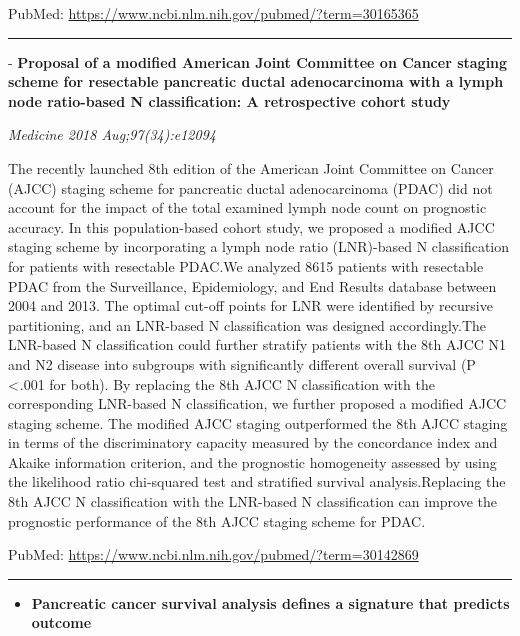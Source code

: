\documentclass[]{article}
\providecommand{\tightlist}{%
  \setlength{\itemsep}{0pt}\setlength{\parskip}{0pt}}
\begin{document}
PubMed: \url{https://www.ncbi.nlm.nih.gov/pubmed/?term=30165365}

{}

{}

\begin{center}\rule{0.5\linewidth}{\linethickness}\end{center}

 - \textbf{Proposal of a modified American Joint Committee on Cancer
staging scheme for resectable pancreatic ductal adenocarcinoma with a
lymph node ratio-based N classification: A retrospective cohort study}

\emph{Medicine 2018 Aug;97(34):e12094}

The recently launched 8th edition of the American Joint Committee on
Cancer (AJCC) staging scheme for pancreatic ductal adenocarcinoma (PDAC)
did not account for the impact of the total examined lymph node count on
prognostic accuracy. In this population-based cohort study, we proposed
a modified AJCC staging scheme by incorporating a lymph node ratio
(LNR)-based N classification for patients with resectable PDAC.We
analyzed 8615 patients with resectable PDAC from the Surveillance,
Epidemiology, and End Results database between 2004 and 2013. The
optimal cut-off points for LNR were identified by recursive
partitioning, and an LNR-based N classification was designed
accordingly.The LNR-based N classification could further stratify
patients with the 8th AJCC N1 and N2 disease into subgroups with
significantly different overall survival (P \textless{} .001 for both).
By replacing the 8th AJCC N classification with the corresponding
LNR-based N classification, we further proposed a modified AJCC staging
scheme. The modified AJCC staging outperformed the 8th AJCC staging in
terms of the discriminatory capacity measured by the concordance index
and Akaike information criterion, and the prognostic homogeneity
assessed by using the likelihood ratio chi-squared test and stratified
survival analysis.Replacing the 8th AJCC N classification with the
LNR-based N classification can improve the prognostic performance of the
8th AJCC staging scheme for PDAC.

PubMed: \url{https://www.ncbi.nlm.nih.gov/pubmed/?term=30142869}

{}

{}

\begin{center}\rule{0.5\linewidth}{\linethickness}\end{center}

\begin{itemize}
\tightlist
\item
  \textbf{Pancreatic cancer survival analysis defines a signature that
  predicts outcome}
\end{itemize}
\end{document}
